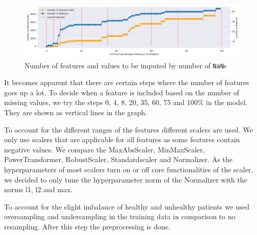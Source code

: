 \begin{figure}[h]
	\centering
	\includegraphics[width=\textwidth]{images/percentageToBeDropped.png}
	\caption{Number of features and values to be imputed by number of \texttt{NaN}s}
	\label{fig:percentageToBeDropped}
\end{figure}

It becomes apparent that there are certain steps where the number of features goes up a lot. To decide when a feature is included based on the number of missing values, we try the steps 0, 4, 8, 20, 35, 60, 75 and 100\% in the model. They are shown as vertical lines in the graph. 

To account for the different ranges of the features different scalers are used. We only use scalers that are applicable for all features as some features contain negative values.
We compare the MaxAbsScaler, MinMaxScaler, PowerTransformer, RobustScaler, Standardscaler and Normalizer. As the hyperparameters of most scalers turn on or off core functionalities of the scaler, we decided to only tune the hyperparameter norm of the Normalizer with the norms l1, l2 and max.

To account for the slight imbalance of healthy and unhealthy patients we used oversampling and undersampling in the training data in comparison to no resampling. After this step the preprocessing is done. 


